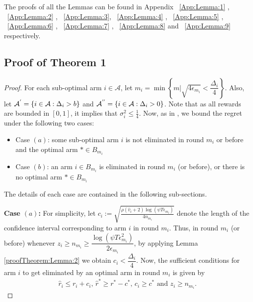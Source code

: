 The proofs of all the Lemmas can be found in Appendix ~\ref{App:Lemma:1} , ~\ref{App:Lemma:2} , ~\ref{App:Lemma:3}, ~\ref{App:Lemma:4} , ~\ref{App:Lemma:5} , ~\ref{App:Lemma:6} , ~\ref{App:Lemma:7} , ~\ref{App:Lemma:8} and ~\ref{App:Lemma:9} respectively.


\subsection*{Proof of Theorem 1}
\label{sec:proofTheorem:Theorem1}
\begin{proof}
For each sub-optimal arm ${i}\in\mathcal{A}$, let $m_{i}=\min{\left\lbrace m|\sqrt{4\epsilon_{m_i}} < \dfrac{\Delta_{i}}{4}\right\rbrace}$. Also, let $\mathcal{A}^{'}=\lbrace i\in \mathcal{A}: \Delta_{i} > b \rbrace$ and $\mathcal{A}^{''}=\lbrace i\in \mathcal{A}: \Delta_{i} > 0 \rbrace$. Note that as all rewards are bounded in $[0,1]$, it implies that $\sigma_i^2 \leq \frac{1}{4}$. Now, as in \cite{auer2010ucb}, we bound the regret under the following two cases: 
\begin{itemize}
\item {Case $(a)$}: some sub-optimal arm ${i}$ is not eliminated in round $m_{i}$ or before and the optimal arm ${*}\in B_{m_{i}}$
\item {Case $(b)$}: an arm ${i}\in B_{m_i}$ is eliminated in round $m_{i}$ (or before), or there is no optimal arm $*\in B_{m_i}$
\end{itemize} 
The details of each case are contained in the following sub-sections.


\textbf{Case $(a)$:}
For simplicity, let $c_{i} := \sqrt{\frac{\rho (\hat{v}_i + 2) \log (\psi T\epsilon_{m_{i}})}{4 n_{m_i}}}$ denote the length of the confidence interval corresponding to arm $i$ in round $m_i$. Thus, in round $m_i$ (or before) whenever $z_i \geq n_{m_{i}}\ge\dfrac{\log{(\psi T\epsilon_{m_{i}}^{2})}}{2\epsilon_{m_{i}}}$, by applying Lemma \ref{proofTheorem:Lemma:2} we obtain $c_{i} < \dfrac{\Delta_{i}}{4}$.
Now, the sufficient conditions for arm $i$ to get eliminated by an optimal arm in round $m_i$ is given by
	\begin{eqnarray}
	\hat{r}_{i} \leq r_{i} + c_{i} \text{, } \label{eq:armelim-casea}
 	\hat{r}^{*} \geq r^{*} - c^{*} \text{, } c_{i} \geq c^* \text{ and } z_i \geq n_{m_i} .
	\end{eqnarray}


\end{proof}
